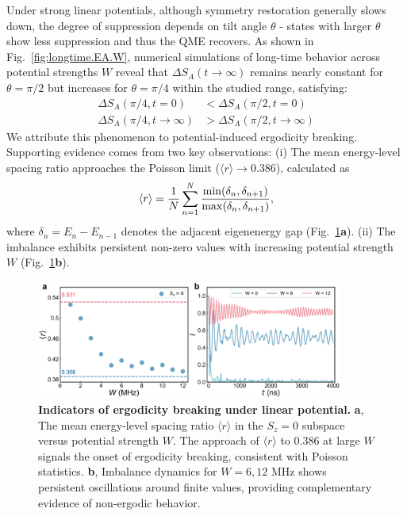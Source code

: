 \documentclass[reprint,superscriptaddress,preprintnumbers,longbibliography,
amsmath,amssymb,aps,floatfix,pra,twocolumn, tightenlines %
]{revtex4-2}
\begin{document}
    Under strong linear potentials, although symmetry restoration generally slows down, the degree of suppression depends on tilt angle $\theta$ - states with larger $\theta$ show less suppression and thus the QME recovers.
    As shown in Fig.~\ref{fig:longtime.EA.W}, numerical simulations of long-time behavior across potential strengths $W$  reveal that $\Delta S_A(t\rightarrow \infty)$ remains nearly constant for $\theta=\pi/2$ but increases for $\theta=\pi/4$ within the studied range, satisfying:
    \begin{align}
    \Delta S_A(\pi/4,t=0) &< \Delta S_A(\pi/2,t=0) \\
    \Delta S_A(\pi/4,t\to\infty) &> \Delta S_A(\pi/2,t\to\infty)
    \end{align}
    We attribute this phenomenon to potential-induced ergodicity breaking. 
    Supporting evidence comes from two key observations:
    (i) The mean energy-level spacing ratio approaches the Poisson limit ($\langle r \rangle \to 0.386$), calculated as
    \begin{equation}
    \expval{r} = \frac{1}{N} \sum_{n=1}^N \frac{\min(\delta_n, \delta_{n+1})}{\max(\delta_n, \delta_{n+1})},
    \end{equation}
    where $\delta_n = E_n - E_{n-1} $ denotes the adjacent eigenenergy gap (Fig.~\ref{fig:r.Imbalance}\textbf{a}).
    (ii) The imbalance exhibits persistent non-zero values with increasing potential strength $W$ (Fig.~\ref{fig:r.Imbalance}\textbf{b}).
    
    \begin{figure}[t]
    \centering
    \includegraphics[width=0.9\textwidth]{suppFig/SuppFig5_r_Imbalance.pdf}
    \caption{
        \textbf{Indicators of ergodicity breaking under linear potential.} 
        \textbf{a}, The mean energy-level spacing ratio $\langle r \rangle$ in the $S_z=0$ subspace versus potential strength $W$. The approach of $\langle r \rangle$ to $0.386$ at large $W$ signals the onset of ergodicity breaking, consistent with Poisson statistics. 
        \textbf{b}, Imbalance dynamics for $W=6,12$ MHz shows persistent oscillations around finite values, providing complementary evidence of non-ergodic behavior.
    }
    \label{fig:r.Imbalance}
    \end{figure}
    
\end{document}
